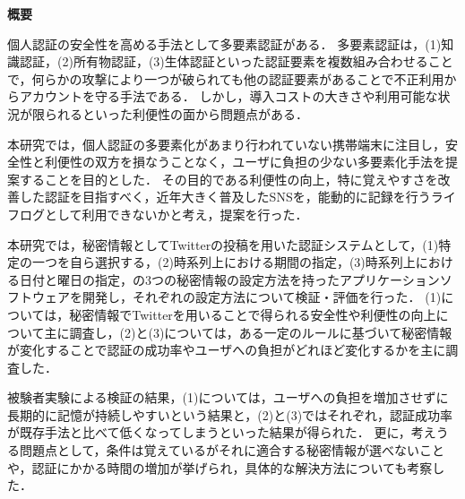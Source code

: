 \thispagestyle{empty}

\noindent
\begin{center}
\LARGE \bf 概要\\
\end{center}

\vspace{1.0cm}
{\small}
\normalsize

個人認証の安全性を高める手法として多要素認証がある．
多要素認証は，(1)知識認証，(2)所有物認証，(3)生体認証といった認証要素を複数組み合わせることで，何らかの攻撃により一つが破られても他の認証要素があることで不正利用からアカウントを守る手法である．
しかし，導入コストの大きさや利用可能な状況が限られるといった利便性の面から問題点がある．

本研究では，個人認証の多要素化があまり行われていない携帯端末に注目し，安全性と利便性の双方を損なうことなく，ユーザに負担の少ない多要素化手法を提案することを目的とした．
その目的である利便性の向上，特に覚えやすさを改善した認証を目指すべく，近年大きく普及したSNSを，能動的に記録を行うライフログとして利用できないかと考え，提案を行った．

本研究では，秘密情報としてTwitterの投稿を用いた認証システムとして，(1)特定の一つを自ら選択する，(2)時系列上における期間の指定，(3)時系列上における日付と曜日の指定，の3つの秘密情報の設定方法を持ったアプリケーションソフトウェアを開発し，それぞれの設定方法について検証・評価を行った．
(1)については，秘密情報でTwitterを用いることで得られる安全性や利便性の向上について主に調査し，(2)と(3)については，ある一定のルールに基づいて秘密情報が変化することで認証の成功率やユーザへの負担がどれほど変化するかを主に調査した．

被験者実験による検証の結果，(1)については，ユーザへの負担を増加させずに長期的に記憶が持続しやすいという結果と，(2)と(3)ではそれぞれ，認証成功率が既存手法と比べて低くなってしまうといった結果が得られた．
更に，考えうる問題点として，条件は覚えているがそれに適合する秘密情報が選べないことや，認証にかかる時間の増加が挙げられ，具体的な解決方法についても考察した．



\newpage
